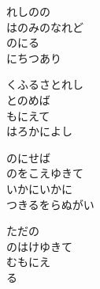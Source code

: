 \documentclass[10pt,b5j]{tarticle} %
\begin{document}
\vspace{1.5em} %
\newcommand{\linespace}{0.5em} %
\newcommand{\blocksize}{0.5\hsize} %
\begin{enumerate} %
    \begin{minipage}[c]{\blocksize}
    
        \vspace{\linespace}
        \item
        れしのの\\
        はのみのなれど\\
        のにる\\
        にちつあり
        
        \vspace{\linespace}
        \item
        くふるさとれし\\
        とのめば\\
        もにえて\\
        はろかによし
        
        \vspace{\linespace}
        \item
        のにせば\\
        のをこえゆきて\\
        いかにいかに\\
        つきるをらぬがい
        
        \vspace{\linespace}
        \item
        ただの\\
        のはけゆきて\\
        むもにえ\\
        る
    
    \end{minipage}
\end{enumerate} %
\end{document}

